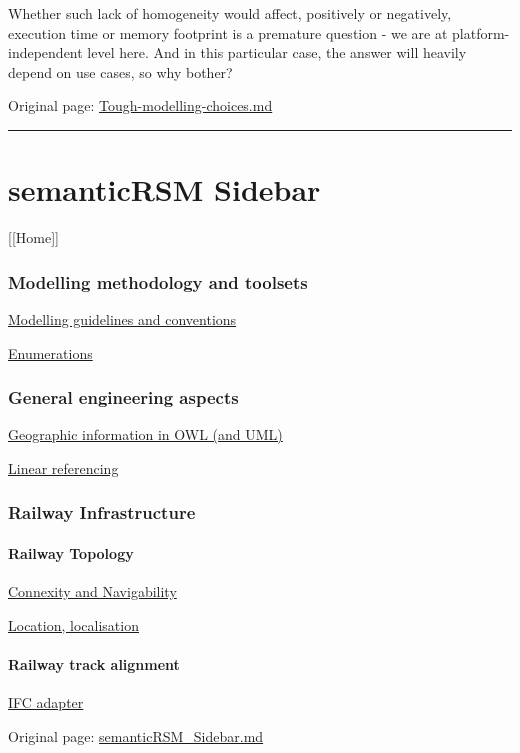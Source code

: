 \documentclass[
  11pt,
]{article}
\begin{document}
Whether such lack of homogeneity would affect, positively or negatively,
execution time or memory footprint is a premature question - we are at
platform-independent level here. And in this particular case, the answer
will heavily depend on use cases, so why bother?

Original page:
\href{https://github.com/UICrail/CDM-RSM/wiki/Tough-modelling-choices}{Tough-modelling-choices.md}

\begin{center}\rule{0.5\linewidth}{0.5pt}\end{center}

\hypertarget{semanticrsm-sidebar}{%
\section{semanticRSM Sidebar}\label{semanticrsm-sidebar}}

{[}{[}Home{]}{]}

\hypertarget{modelling-methodology-and-toolsets}{%
\subsubsection{Modelling methodology and
toolsets}\label{modelling-methodology-and-toolsets}}

\protect\hyperlink{guidelines-and-conventions}{Modelling guidelines and
conventions}

\protect\hyperlink{enumerations}{Enumerations}

\hypertarget{general-engineering-aspects}{%
\subsubsection{General engineering
aspects}\label{general-engineering-aspects}}

\protect\hyperlink{information-in-owl-and-uml}{Geographic information in
OWL (and UML)}

\protect\hyperlink{referencing}{Linear referencing}

\hypertarget{railway-infrastructure}{%
\subsubsection{Railway Infrastructure}\label{railway-infrastructure}}

\hypertarget{railway-topology}{%
\paragraph{Railway Topology}\label{railway-topology}}

\protect\hyperlink{and-navigability}{Connexity and Navigability}

\protect\hyperlink{localisation}{Location, localisation}

\hypertarget{railway-track-alignment}{%
\paragraph{Railway track alignment}\label{railway-track-alignment}}

\protect\hyperlink{adapter}{IFC adapter}

Original page:
\href{https://github.com/UICrail/CDM-RSM/wiki/semanticRSM_Sidebar}{semanticRSM\_Sidebar.md}
\end{document}
